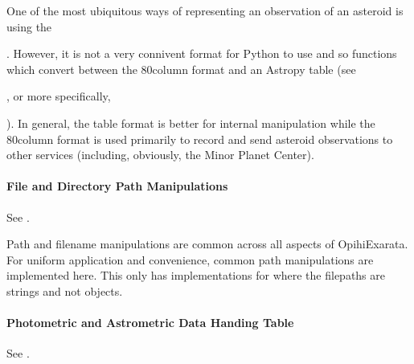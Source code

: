 \documentclass[letterpaper,11pt,english]{sphinxmanual}
\begin{document}
\sphinxAtStartPar
One of the most ubiquitous ways of representing an observation of an asteroid
is using the
%
\begin{footnote}[55]\sphinxAtStartFootnote
{}
%
\end{footnote}.
However, it is not a very connivent format for Python to use and so
functions which convert between the 80\sphinxhyphen{}column format and an Astropy table
(see %
\begin{footnote}[56]\sphinxAtStartFootnote
{}
%
\end{footnote}, or more specifically,
%
\begin{footnote}[57]\sphinxAtStartFootnote
{}
%
\end{footnote}). In general, the table format is better for
internal manipulation while the 80\sphinxhyphen{}column format is used primarily to record
and send asteroid observations to other services (including, obviously, the
Minor Planet Center).


\paragraph{File and Directory Path Manipulations}
\label{\detokenize{technical/architecture/library:file-and-directory-path-manipulations}}
\sphinxAtStartPar
See {\hyperref[\detokenize{code/opihiexarata.library.path:module-opihiexarata.library.path}]{}}.

\sphinxAtStartPar
Path and filename manipulations are common across all aspects of OpihiExarata.
For uniform application and convenience, common path manipulations are
implemented here. This only has implementations for where the filepaths are
strings and not objects.


\paragraph{Photometric and Astrometric Data Handing Table}
\label{\detokenize{technical/architecture/library:photometric-and-astrometric-data-handing-table}}
\sphinxAtStartPar
See {\hyperref[\detokenize{code/opihiexarata.library.phototable:module-opihiexarata.library.phototable}]{}}.
\end{document}
